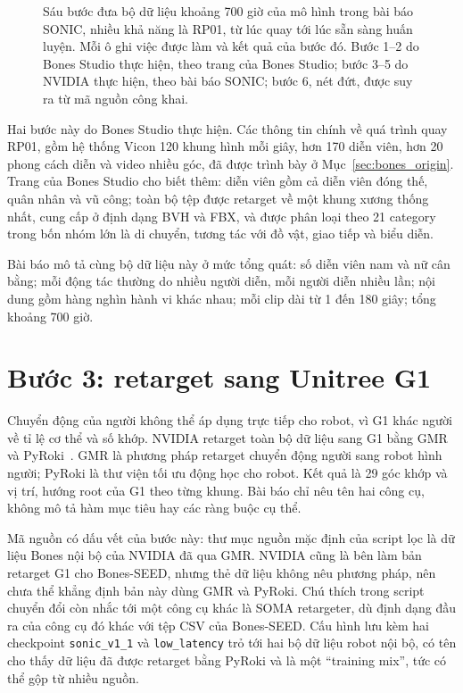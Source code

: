 \documentclass[12pt,a4paper,oneside]{report}
\newcommand{\code}[1]{\texttt{#1}}
\begin{document}
\begin{figure}[htbp]
{}
\caption[Luồng tiền xử lý bộ dữ liệu khoảng 700 giờ]{Sáu bước đưa bộ dữ liệu khoảng 700 giờ của mô hình trong bài báo SONIC, nhiều khả năng là RP01, từ lúc quay tới lúc sẵn sàng huấn luyện. Mỗi ô ghi việc được làm và kết quả của bước đó. Bước 1--2 do Bones Studio thực hiện, theo trang của Bones Studio; bước 3--5 do NVIDIA thực hiện, theo bài báo SONIC; bước 6, nét đứt, được suy ra từ mã nguồn công khai.}
\label{fig:rp01_pipeline}
\end{figure}

Hai bước này do Bones Studio thực hiện. Các thông tin chính về quá trình quay RP01, gồm hệ thống Vicon 120 khung hình mỗi giây, hơn 170 diễn viên, hơn 20 phong cách diễn và video nhiều góc, đã được trình bày ở Mục~\ref{sec:bones_origin}. Trang của Bones Studio cho biết thêm: diễn viên gồm cả diễn viên đóng thế, quân nhân và vũ công; toàn bộ tệp được retarget về một khung xương thống nhất, cung cấp ở định dạng BVH và FBX, và được phân loại theo 21 category trong bốn nhóm lớn là di chuyển, tương tác với đồ vật, giao tiếp và biểu diễn.

Bài báo mô tả cùng bộ dữ liệu này ở mức tổng quát: số diễn viên nam và nữ cân bằng; mỗi động tác thường do nhiều người diễn, mỗi người diễn nhiều lần; nội dung gồm hàng nghìn hành vi khác nhau; mỗi clip dài từ 1 đến 180 giây; tổng khoảng 700 giờ.

\section{Bước 3: retarget sang Unitree G1}
\label{sec:rp01_retarget}

Chuyển động của người không thể áp dụng trực tiếp cho robot, vì G1 khác người về tỉ lệ cơ thể và số khớp. NVIDIA retarget toàn bộ dữ liệu sang G1 bằng GMR~\cite{gmr} và PyRoki~\cite{pyroki}. GMR là phương pháp retarget chuyển động người sang robot hình người; PyRoki là thư viện tối ưu động học cho robot. Kết quả là 29 góc khớp và vị trí, hướng root của G1 theo từng khung. Bài báo chỉ nêu tên hai công cụ, không mô tả hàm mục tiêu hay các ràng buộc cụ thể.

Mã nguồn có dấu vết của bước này: thư mục nguồn mặc định của script lọc là dữ liệu Bones nội bộ của NVIDIA đã qua GMR. NVIDIA cũng là bên làm bản retarget G1 cho Bones-SEED, nhưng thẻ dữ liệu không nêu phương pháp, nên chưa thể khẳng định bản này dùng GMR và PyRoki. Chú thích trong script chuyển đổi còn nhắc tới một công cụ khác là SOMA retargeter, dù định dạng đầu ra của công cụ đó khác với tệp CSV của Bones-SEED. Cấu hình lưu kèm hai checkpoint \code{sonic\_v1\_1} và \code{low\_latency} trỏ tới hai bộ dữ liệu robot nội bộ, có tên cho thấy dữ liệu đã được retarget bằng PyRoki và là một ``training mix'', tức có thể gộp từ nhiều nguồn.
\end{document}
